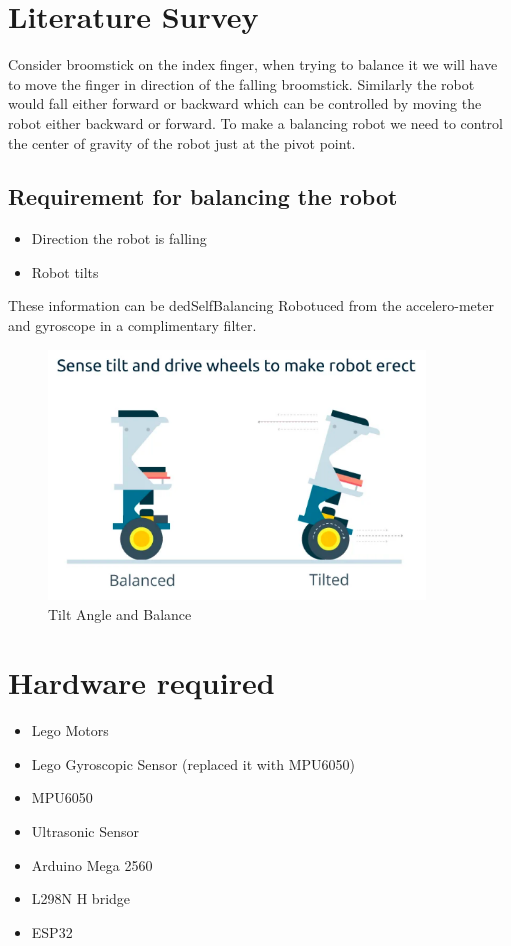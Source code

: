 \documentclass{article}
\begin{document}
	\section{Literature Survey}
	Consider broomstick on the index finger, when trying to balance it we will have to move the finger in direction of the falling broomstick. Similarly the robot would fall either forward or backward which can be controlled by moving the robot either backward or forward.
	To make a balancing robot we need to control the center of gravity of the robot just at the pivot point. 
	\subsection{Requirement for balancing the robot}	
	\begin{itemize}
		\item Direction the robot is falling 
		\item Robot tilts
	\end{itemize}	
	These information can be dedSelfBalancing Robotuced from the accelero-meter and gyroscope in a complimentary filter.
	
	\begin{figure}[h]
		\centering
		\includegraphics[width=100mm,scale=0.5]{balance}
		\caption{Tilt Angle and Balance}
		\label{Fig.1: Tilt Angle and Balance}
	\end{figure}

\pagebreak
	\section{Hardware required}
	 \begin{itemize}
	 	\item Lego Motors   
	 	\item Lego Gyroscopic Sensor  (replaced it with MPU6050)
	 	\item MPU6050
	 	\item Ultrasonic Sensor
	 	\item Arduino Mega 2560
	 	\item L298N H bridge
	 	\item ESP32
	 \end{itemize}
 	
\end{document}
